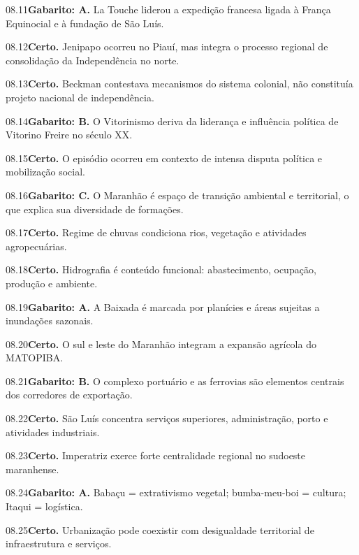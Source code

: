 \begin{solucao}{08.11}\textbf{Gabarito: A.} La Touche liderou a expedição francesa ligada à França Equinocial e à fundação de São Luís.\end{solucao}
\begin{solucao}{08.12}\textbf{Certo.} Jenipapo ocorreu no Piauí, mas integra o processo regional de consolidação da Independência no norte.\end{solucao}
\begin{solucao}{08.13}\textbf{Certo.} Beckman contestava mecanismos do sistema colonial, não constituía projeto nacional de independência.\end{solucao}
\begin{solucao}{08.14}\textbf{Gabarito: B.} O Vitorinismo deriva da liderança e influência política de Vitorino Freire no século XX.\end{solucao}
\begin{solucao}{08.15}\textbf{Certo.} O episódio ocorreu em contexto de intensa disputa política e mobilização social.\end{solucao}
\begin{solucao}{08.16}\textbf{Gabarito: C.} O Maranhão é espaço de transição ambiental e territorial, o que explica sua diversidade de formações.\end{solucao}
\begin{solucao}{08.17}\textbf{Certo.} Regime de chuvas condiciona rios, vegetação e atividades agropecuárias.\end{solucao}
\begin{solucao}{08.18}\textbf{Certo.} Hidrografia é conteúdo funcional: abastecimento, ocupação, produção e ambiente.\end{solucao}
\begin{solucao}{08.19}\textbf{Gabarito: A.} A Baixada é marcada por planícies e áreas sujeitas a inundações sazonais.\end{solucao}
\begin{solucao}{08.20}\textbf{Certo.} O sul e leste do Maranhão integram a expansão agrícola do MATOPIBA.\end{solucao}
\begin{solucao}{08.21}\textbf{Gabarito: B.} O complexo portuário e as ferrovias são elementos centrais dos corredores de exportação.\end{solucao}
\begin{solucao}{08.22}\textbf{Certo.} São Luís concentra serviços superiores, administração, porto e atividades industriais.\end{solucao}
\begin{solucao}{08.23}\textbf{Certo.} Imperatriz exerce forte centralidade regional no sudoeste maranhense.\end{solucao}
\begin{solucao}{08.24}\textbf{Gabarito: A.} Babaçu = extrativismo vegetal; bumba-meu-boi = cultura; Itaqui = logística.\end{solucao}
\begin{solucao}{08.25}\textbf{Certo.} Urbanização pode coexistir com desigualdade territorial de infraestrutura e serviços.\end{solucao}

